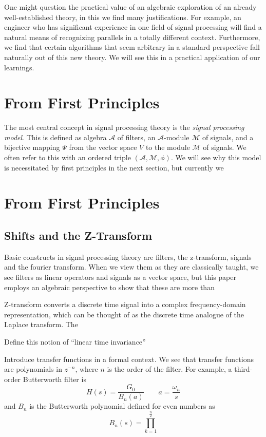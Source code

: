 \documentclass[12pt,technote]{IEEEtran}
\begin{document}
One might question the practical value of an algebraic exploration of an already well-established theory, in this we find many justifications. For example, an engineer who has significant experience in one field of signal processing will find a natural means of recognizing parallels in a totally different context. Furthermore, we find that certain algorithms that seem arbitrary in a standard perspective fall naturally out of this new theory. We will see this in a practical application of our learnings.%
\section{From First Principles}

The most central concept in signal processing theory is the \textit{signal processing model}. This is defined as algebra $\mathcal{A}$ of filters, an $\mathcal{A}$-module $\mathcal{M}$ of signals, and a bijective mapping $\Psi$ from the vector space $V$ to the module $\mathcal{M}$ of signals. We often refer to this with an ordered triple $(\mathcal{A,M,\phi})$. We will see why this model is necessitated by first principles in the next section, but currently we 

\section{From First Principles}

\subsection{Shifts and the Z-Transform}


\cite{AlgebraicSignalProcessing2006}
Basic constructs in signal processing theory are filters, the z-transform, signals and the fourier transform. When we view them as they are classically taught, we see filters as linear operators and signals as a vector space, but this paper employs an algebraic perspective to show that these are more than 

Z-transform converts a discrete time signal  into a complex frequency-domain representation, which can be thought of as the discrete time analogue of the Laplace transform. The 

Define this notion of ``linear time invariance''

Introduce transfer functions in a formal context.
We see that transfer functions are polynomials in $z^{-n}$, where $n$ is the order of the filter. For example, a third-order Butterworth filter is
\begin{equation*}
    H(s) = \frac{G_0}{B_n(a)} \qquad a = \frac{\omega_n}{s}
\end{equation*}
and $B_n$ is the Butterworth polynomial defined for even numbers as
\begin{equation*}
    B_n(s) = \prod_{k=1}^\frac{n}{2}
\end{equation*}
\end{document}
